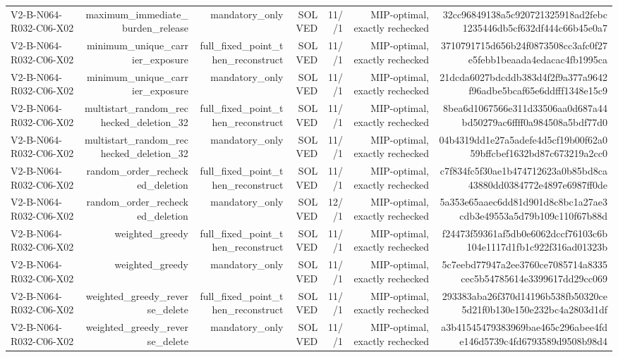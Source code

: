 {\begin{longtable}{lrrrrrr}
V2-B-N064-R032-C06-X02 & maximum\_immediate\_burden\_release & mandatory\_only & SOLVED & 11//1 & MIP-optimal, exactly rechecked & 32cc96849138a5c920721325918ad2febc1235446db5cf632df444c66b45e0a7 \\
V2-B-N064-R032-C06-X02 & minimum\_unique\_carrier\_exposure & full\_fixed\_point\_then\_reconstruct & SOLVED & 11//1 & MIP-optimal, exactly rechecked & 3710791715d656b24f0873508cc3afc0f27e5febb1beaada4edacac4fb1995ca \\
V2-B-N064-R032-C06-X02 & minimum\_unique\_carrier\_exposure & mandatory\_only & SOLVED & 11//1 & MIP-optimal, exactly rechecked & 21dcda6027bdcddb383d4f2f9a377a9642f96adbe5bcaf65e6ddfff1348e15c9 \\
V2-B-N064-R032-C06-X02 & multistart\_random\_rechecked\_deletion\_32 & full\_fixed\_point\_then\_reconstruct & SOLVED & 11//1 & MIP-optimal, exactly rechecked & 8bea6d1067566e311d33506aa0d687a44bd50279ac6ffff0a984508a5bdf77d0 \\
V2-B-N064-R032-C06-X02 & multistart\_random\_rechecked\_deletion\_32 & mandatory\_only & SOLVED & 11//1 & MIP-optimal, exactly rechecked & 04b4319dd1e27a5adefe4d5cf19b00f62a059bffcbef1632bd87c673219a2cc0 \\
V2-B-N064-R032-C06-X02 & random\_order\_rechecked\_deletion & full\_fixed\_point\_then\_reconstruct & SOLVED & 11//1 & MIP-optimal, exactly rechecked & c7f834fc5f30ae1b474712623a0b85bd8ca43880dd0384772e4897e6987ff0de \\
V2-B-N064-R032-C06-X02 & random\_order\_rechecked\_deletion & mandatory\_only & SOLVED & 12//1 & MIP-optimal, exactly rechecked & 5a353e65aaec6dd81d901d8c8bc1a27ae3cdb3e49553a5d79b109c110f67b88d \\
V2-B-N064-R032-C06-X02 & weighted\_greedy & full\_fixed\_point\_then\_reconstruct & SOLVED & 11//1 & MIP-optimal, exactly rechecked & f24473f59361af5db0e6062dccf76103c6b104e1117d1fb1c922f316ad01323b \\
V2-B-N064-R032-C06-X02 & weighted\_greedy & mandatory\_only & SOLVED & 11//1 & MIP-optimal, exactly rechecked & 5c7eebd77947a2ee3760ce7085714a8335cec5b54785614e3399617dd29cc069 \\
V2-B-N064-R032-C06-X02 & weighted\_greedy\_reverse\_delete & full\_fixed\_point\_then\_reconstruct & SOLVED & 11//1 & MIP-optimal, exactly rechecked & 293383aba26f370d14196b538fb50320ce5d21f0b130e150e232bc4a2803d1df \\
V2-B-N064-R032-C06-X02 & weighted\_greedy\_reverse\_delete & mandatory\_only & SOLVED & 11//1 & MIP-optimal, exactly rechecked & a3b41545479383969bae465c296abee4fde146d5739c4fd6793589d9508b98d4 \\

\end{longtable}}
